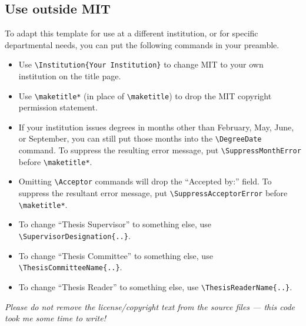 \documentclass[11pt]{article}
\begin{document}
\subsection{Use outside MIT}
To adapt this template for use at a different institution, or for specific departmental needs, you can put the following commands in your preamble.  
\begin{itemize}
\item Use \verb|\Institution{Your Institution}| to change MIT to your own institution on the title page.

\item Use \verb|\maketitle*| (in place of \verb|\maketitle|) to drop the MIT copyright permission statement.

\item If your institution issues degrees in months other than February, May, June, or September, you can still put those months into the 
\verb|\DegreeDate| command. To suppress the resulting error message, put \verb|\SuppressMonthError| before \verb|\maketitle*|. 

\item Omitting \verb|\Acceptor| commands will drop the ``Accepted by:'' field. To suppress the resultant error message, put \verb|\SuppressAcceptorError| before \verb|\maketitle*|.

\item To change ``Thesis Supervisor'' to something else, use \verb|\SupervisorDesignation{..}|.
\item To change ``Thesis Committee''  to something else, use \verb|\ThesisCommitteeName{..}|.
\item To change ``Thesis Reader''  to something else, use \verb|\ThesisReaderName{..}|.

\end{itemize}
\emph{Please do not remove the license/copyright text from the source files --- this code took me some time to write!}
\end{document}
